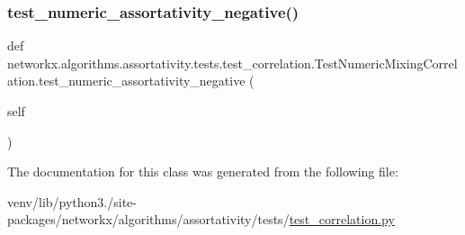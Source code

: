 \subsubsection{\texorpdfstring{test\+\_\+numeric\+\_\+assortativity\+\_\+negative()}{test\_numeric\_assortativity\_negative()}}
{\footnotesize\ttfamily def networkx.\+algorithms.\+assortativity.\+tests.\+test\+\_\+correlation.\+Test\+Numeric\+Mixing\+Correlation.\+test\+\_\+numeric\+\_\+assortativity\+\_\+negative (\begin{DoxyParamCaption}\item[{}]{self }\end{DoxyParamCaption})}



The documentation for this class was generated from the following file\+:\begin{DoxyCompactItemize}
\item 
venv/lib/python3./site-\/packages/networkx/algorithms/assortativity/tests/\hyperlink{test__correlation_8py}{test\+\_\+correlation.\+py}\end{DoxyCompactItemize}

